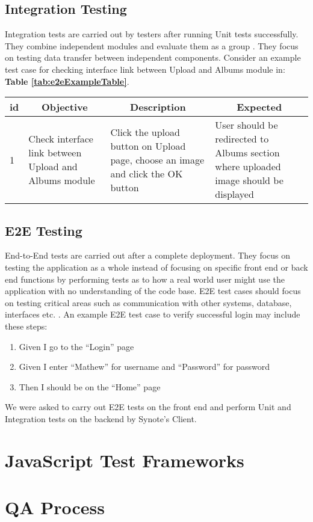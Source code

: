\subsection{Integration Testing}
\label{subsec:unit-testing}

Integration tests are carried out by testers after running Unit tests successfully. They combine independent modules and evaluate them as a group \cite{search-software-quality}. They focus on testing data transfer between independent components. Consider an example test case for checking interface link between Upload and Albums module in:  \textbf{Table \ref{tab:e2eExampleTable}}. \\

\begin{tabular}{ |p{0.5cm}|p{4cm}|p{4cm}|p{4cm}|  }

 \hline
 	\multicolumn{1}{|c|}{id} &
 	\multicolumn{1}{|c|}{Objective} &
 	\multicolumn{1}{|c|}{Description} &
 	\multicolumn{1}{|c|}{Expected}  \\
 \hline
 	1 & Check interface link between Upload and Albums module & Click the upload button on Upload page, choose an image and click the OK button & User should be redirected to Albums section where uploaded image should be displayed \\
 \hline

\end{tabular}
\label{tab:e2eExampleTable}
\vspace{0.4cm}

\subsection{E2E Testing}
\label{subsec:e2e-testing}

End-to-End tests are carried out after a complete deployment. They focus on testing the application as a whole instead of focusing on specific front end or back end functions by performing tests as to how a real world user might use the application with no understanding of the code base. E2E test cases should focus on testing critical areas such as communication with other systems, database, interfaces etc. \cite{tutorialspoint}. An example E2E test case to verify successful login may include these steps:\\

\begin{enumerate}
	\item Given I go to the “Login” page
    \item Given I enter “Mathew” for username and “Password” for password
    \item Then I should be on the “Home” page
\end{enumerate}

We were asked to carry out E2E tests on the front end and perform Unit and Integration tests on the backend by Synote’s Client.\\

\section{JavaScript Test Frameworks}
\label{sec:frameworks}

\section{QA Process}
\label{sec:qa-process}
